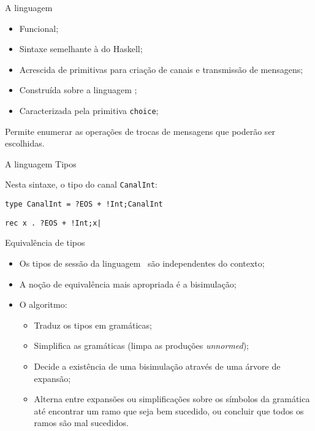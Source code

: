\lstset{language=freest, numbers=none, escapeinside=||}

\begin{frame}[fragile]{A linguagem \mixedchoice}
  \begin{itemize}
  \item Funcional;\pause
  \item Sintaxe semelhante à do Haskell;\pause
  \item Acrescida de primitivas para criação de canais e transmissão de mensagens;\pause
  \item Construída sobre a linguagem \freest;\pause
  \item Caracterizada pela primitiva \lstinline|choice|;\pause
  \end{itemize}

  \begin{tcolorbox}
Permite enumerar as operações de trocas de mensagens que poderão ser escolhidas.
\end{tcolorbox}
\end{frame}

\begin{frame}[fragile]{A linguagem \mixedchoice  \hfill \color{mLightBrown}Tipos}
  
  \pause
  Nesta sintaxe, o tipo do canal \lstinline|CanalInt|:
  \begin{lstlisting}
type CanalInt = ?EOS + !Int;CanalInt
\end{lstlisting}
\pause
\begin{lstlisting}
rec x . ?EOS + !Int;x|
\end{lstlisting}
\end{frame}

\begin{frame}[fragile]{Equivalência de tipos}
  \begin{itemize}
  \item Os tipos de sessão da linguagem \mixedchoice$\,$ são independentes do contexto;
    \pause
  \item A noção de equivalência mais apropriada é a bisimulação;
    \pause
  \item O algoritmo:
    \begin{itemize}
    \item Traduz os tipos em gramáticas;
      \pause
    \item Simplifica as gramáticas (limpa as produções \textit{unnormed});
      \pause
    \item Decide a existência de uma bisimulação através de uma árvore de expansão;
      \pause
    \item Alterna entre expansões ou simplificações sobre os símbolos da gramática
      até encontrar um ramo que seja bem sucedido, ou concluir que todos os ramos são mal sucedidos.
    \end{itemize}
\end{itemize}
\end{frame}


